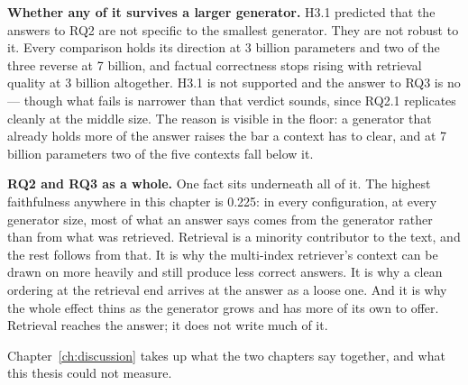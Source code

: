 \textbf{Whether any of it survives a larger generator.} H3.1 predicted that the answers to RQ2 are
not specific to the smallest generator. They are not robust to it. Every comparison holds its
direction at 3 billion parameters and two of the three reverse at 7 billion, and factual
correctness stops rising with retrieval quality at 3 billion altogether. H3.1 is not supported and
the answer to RQ3 is no --- though what fails is narrower than that verdict sounds, since RQ2.1
replicates cleanly at the middle size. The reason is visible in the floor: a generator that already
holds more of the answer raises the bar a context has to clear, and at 7 billion parameters two of
the five contexts fall below it.

\textbf{RQ2 and RQ3 as a whole.} One fact sits underneath all of it. The highest faithfulness
anywhere in this chapter is 0.225: in every configuration, at every generator size, most of what an
answer says comes from the generator rather than from what was retrieved. Retrieval is a minority
contributor to the text, and the rest follows from that. It is why the multi-index retriever's
context can be drawn on more heavily and still produce less correct answers. It is why a clean
ordering at the retrieval end arrives at the answer as a loose one. And it is why the whole effect
thins as the generator grows and has more of its own to offer. Retrieval reaches the answer; it
does not write much of it.

Chapter~\ref{ch:discussion} takes up what the two chapters say together, and what this thesis could
not measure.
